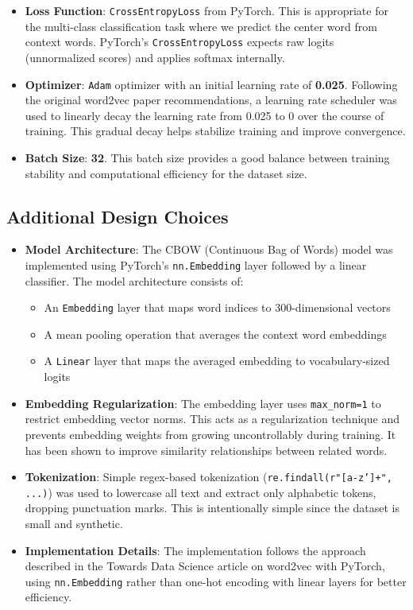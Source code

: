 \documentclass[11pt]{article}
\begin{document}
\begin{itemize}
  \item \textbf{Loss Function}: \texttt{CrossEntropyLoss} from PyTorch. This is appropriate for the multi-class classification task where we predict the center word from context words. PyTorch's \texttt{CrossEntropyLoss} expects raw logits (unnormalized scores) and applies softmax internally.
  
  \item \textbf{Optimizer}: \texttt{Adam} optimizer with an initial learning rate of \textbf{0.025}. Following the original word2vec paper recommendations, a learning rate scheduler was used to linearly decay the learning rate from 0.025 to 0 over the course of training. This gradual decay helps stabilize training and improve convergence.
  
  \item \textbf{Batch Size}: \textbf{32}. This batch size provides a good balance between training stability and computational efficiency for the dataset size.
\end{itemize}

\subsection{Additional Design Choices}

\begin{itemize}
  \item \textbf{Model Architecture}: The CBOW (Continuous Bag of Words) model was implemented using PyTorch's \texttt{nn.Embedding} layer followed by a linear classifier. The model architecture consists of:
  \begin{itemize}
    \item An \texttt{Embedding} layer that maps word indices to 300-dimensional vectors
    \item A mean pooling operation that averages the context word embeddings
    \item A \texttt{Linear} layer that maps the averaged embedding to vocabulary-sized logits
  \end{itemize}
  
  \item \textbf{Embedding Regularization}: The embedding layer uses \texttt{max\_norm=1} to restrict embedding vector norms. This acts as a regularization technique and prevents embedding weights from growing uncontrollably during training. It has been shown to improve similarity relationships between related words.
  
  \item \textbf{Tokenization}: Simple regex-based tokenization (\texttt{re.findall(r"[a-z']+", ...)}) was used to lowercase all text and extract only alphabetic tokens, dropping punctuation marks. This is intentionally simple since the dataset is small and synthetic.
  
  \item \textbf{Implementation Details}: The implementation follows the approach described in the Towards Data Science article on word2vec with PyTorch, using \texttt{nn.Embedding} rather than one-hot encoding with linear layers for better efficiency.
\end{itemize}
\end{document}
